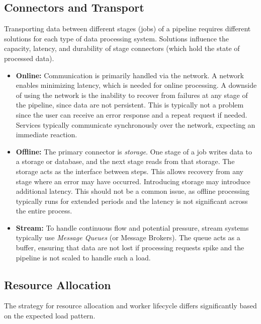 \subsection{Connectors and Transport}
Transporting data between different stages (jobs) of a pipeline requires different solutions for each type of data processing system. Solutions influence the capacity, latency, and durability of stage connectors (which hold the state of processed data).

\begin{itemize}
    \item \textbf{Online:} Communication is primarily handled via the network. A network enables minimizing latency, which is needed for online processing. A downside of using the network is the inability to recover from failures at any stage of the pipeline, since data are not persistent. This is typically not a problem since the user can receive an error response and a repeat request if needed. \\
    Services typically communicate synchronously over the network, expecting an immediate reaction.
    \item \textbf{Offline:} The primary connector is \textit{storage}. One stage of a job writes data to a storage or database, and the next stage reads from that storage. The storage acts as the interface between steps. This allows recovery from any stage where an error may have occurred. Introducing storage may introduce additional latency. This should not be a common issue, as offline processing typically runs for extended periods and the latency is not significant across the entire process.
    \item \textbf{Stream:} To handle continuous flow and potential pressure, stream systems typically use \textit{Message Queues} (or Message Brokers). The queue acts as a buffer, ensuring that data are not lost if processing requests spike and the pipeline is not scaled to handle such a load.

\cite{kleppmann_designing_2017}
\end{itemize}

\subsection{Resource Allocation}
The strategy for resource allocation and worker lifecycle differs significantly based on the expected load pattern.


